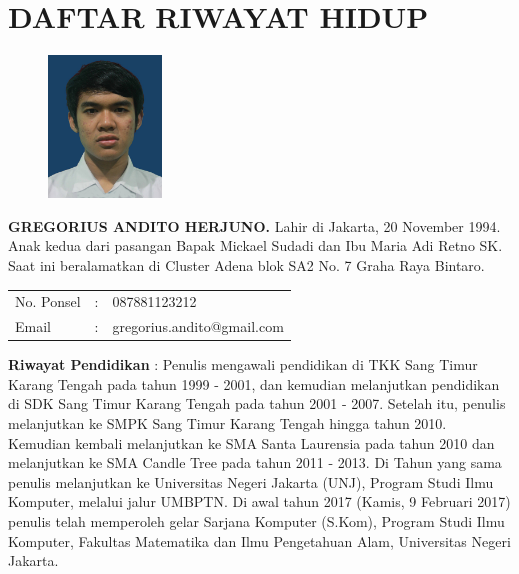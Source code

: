 \pagestyle{empty}
\chapter*{\centering \large DAFTAR RIWAYAT HIDUP}
\thispagestyle{empty}

\begin{figure}
	\vspace{-25pt}
	\begin{center}
		\includegraphics[width=0.27\textwidth]{gambar/pas-foto}
	\end{center}
	\vspace{-80pt}
\end{figure}

\noindent \textbf{GREGORIUS ANDITO HERJUNO.}  Lahir di Jakarta, 20 November 1994.  Anak kedua dari pasangan Bapak Mickael Sudadi dan Ibu Maria Adi Retno SK. Saat ini beralamatkan di Cluster Adena blok SA2 No. 7 Graha Raya Bintaro.

\vspace{0.5cm}
\noindent
\begin{center}
	\begin{flushright}
		\begin{tabular}{lcl}
			No. Ponsel	& :&  087881123212 \\
			Email	& :&  gregorius.andito@gmail.com
		\end{tabular}
	\end{flushright}
\end{center}
\vspace{0.5cm}

\noindent \textbf{Riwayat Pendidikan} : Penulis mengawali pendidikan di TKK Sang Timur Karang Tengah pada tahun 1999 - 2001, dan kemudian melanjutkan pendidikan di SDK Sang Timur Karang Tengah pada tahun 2001 - 2007. Setelah itu, penulis melanjutkan ke SMPK Sang Timur Karang Tengah hingga tahun 2010. Kemudian kembali melanjutkan ke SMA Santa Laurensia pada tahun 2010 dan melanjutkan ke SMA Candle Tree pada tahun 2011 - 2013. Di Tahun yang sama penulis melanjutkan ke Universitas Negeri Jakarta (UNJ), Program Studi Ilmu Komputer, melalui jalur UMBPTN. Di awal tahun 2017 (Kamis, 9 Februari 2017) penulis telah memperoleh gelar Sarjana Komputer (S.Kom), Program Studi Ilmu Komputer, Fakultas Matematika dan Ilmu Pengetahuan Alam, Universitas Negeri Jakarta.

